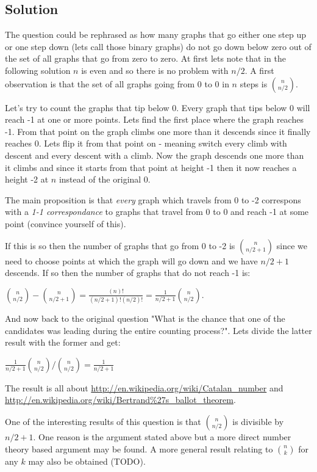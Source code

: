 \documentclass{article}
\begin{document}
\subsection{Solution}
The question could be rephrased as how many graphs that go either one step up or one step down (lets call those binary graphs) do not go down below zero out of the set of all graphs that go from zero to zero. At first lets note that in the following solution $n$ is even and so there is no problem with $n/2$. A first observation is that the set of all graphs going from 0 to 0 in $n$ steps is ${n \choose n/2}$.

Let's try to count the graphs that tip below 0. Every graph that tips below 0 will reach -1 at one or more points. Lets find the first place where the graph reaches -1. From that point on the graph climbs one more than it descends since it finally reaches 0. Lets flip it from that point on - meaning switch every climb with descent and every descent with a climb. Now the graph descends one more than it climbs and since it starts from that point at height -1 then it now reaches a height -2 at $n$ instead of the original 0.

The main proposition is that \emph{every} graph which travels from 0 to -2 correspons with a \emph{1-1 correspondance} to graphs that travel from 0 to 0 and reach -1 at some point (convince yourself
of this).

If this is so then the number of graphs that go from 0 to -2 is ${n \choose n/2+1}$ since we need to
choose points at which the graph will go down and we have $n/2+1$ descends. If so then the number of
graphs that do not reach -1 is:

${n \choose n/2} - {n \choose n/2+1} = \frac{(n)!}{(n/2+1)!(n/2)!} = \frac{1}{n/2+1}{n \choose n/2}$.

And now back to the original question "What is the chance that one of the candidates was leading during the entire counting process?". Lets divide the latter result with the former and get:

$\frac{1}{n/2+1}{n \choose n/2} / {n \choose n/2} = \frac{1}{n/2+1}$

The result is all about \href{Catalan numbers}{http://en.wikipedia.org/wiki/Catalan\_number}
and \href{Bertrand's ballot theorem}{http://en.wikipedia.org/wiki/Bertrand\%27s\_ballot\_theorem}.

One of the interesting results of this question is that ${n \choose n/2}$ is divisible by $n/2+1$. One reason
is the argument stated above but a more direct number theory based argument may be found. A more general result
relating to ${n \choose k}$ for any $k$ may also be obtained (TODO).
\end{document}

